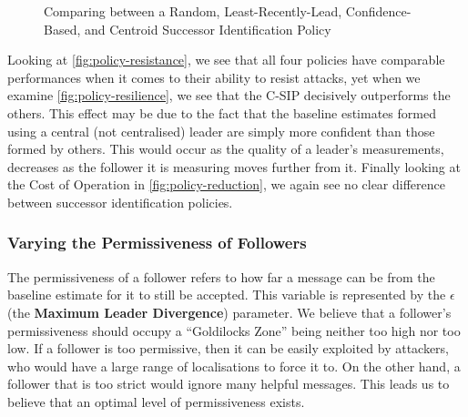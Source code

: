\begin{figure}[!h]
	\centering
	\caption{Comparing between a Random, Least-Recently-Lead, Confidence-Based, and Centroid Successor Identification Policy}
        \label{fig:policy}
\end{figure}

Looking at \autoref{fig:policy-resistance}, we see that all four policies have comparable performances when it comes to their ability to resist attacks, yet when we examine \autoref{fig:policy-resilience}, we see that the C-SIP decisively outperforms the others. This effect may be due to the fact that the baseline estimates formed using a central (not centralised) leader are simply more confident than those formed by others. This would occur as the quality of a leader's measurements, decreases as the follower it is measuring moves further from it. Finally looking at the Cost of Operation in \autoref{fig:policy-reduction}, we again see no clear difference between successor identification policies.

\subsubsection{Varying the Permissiveness of Followers}
The permissiveness of a follower refers to how far a message can be from the baseline estimate for it to still be accepted. This variable is represented by the $\epsilon$ (the \textbf{Maximum Leader Divergence}) parameter. We believe that a follower's permissiveness should occupy a ``Goldilocks Zone'' being neither too high nor too low. If a follower is too permissive, then it can be easily exploited by attackers, who would have a large range of localisations to force it to. On the other hand, a follower that is too strict would ignore many helpful messages. This leads us to believe that an optimal level of permissiveness exists.

